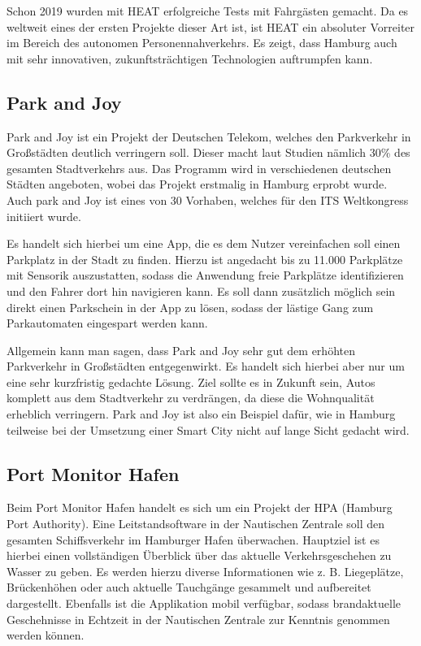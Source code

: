 Schon 2019 wurden mit HEAT erfolgreiche Tests mit Fahrgästen gemacht.
Da es weltweit eines der ersten Projekte dieser Art ist, ist HEAT ein absoluter Vorreiter im Bereich des autonomen Personennahverkehrs.
Es zeigt, dass Hamburg auch mit sehr innovativen, zukunftsträchtigen Technologien auftrumpfen kann.

\subsection{Park and Joy}

Park and Joy ist ein Projekt der Deutschen Telekom, welches den Parkverkehr in Großstädten deutlich verringern soll. Dieser macht laut Studien nämlich 30\% des gesamten Stadtverkehrs aus. Das Programm wird in verschiedenen deutschen Städten angeboten, wobei das Projekt erstmalig in Hamburg erprobt wurde. Auch park and Joy ist eines von 30 Vorhaben, welches für den ITS Weltkongress initiiert wurde. \autocite[vgl.][]{SmartCityKompass.2020a}

Es handelt sich hierbei um eine App, die es dem Nutzer vereinfachen soll einen Parkplatz in der Stadt zu finden. Hierzu ist angedacht bis zu 11.000 Parkplätze mit Sensorik auszustatten, sodass die Anwendung freie Parkplätze identifizieren und den Fahrer dort hin navigieren kann. Es soll dann zusätzlich möglich sein direkt einen Parkschein in der App zu lösen, sodass der lästige Gang zum Parkautomaten eingespart werden kann. \autocite[vgl.][]{ParkandJoy.2020}

Allgemein kann man sagen, dass Park and Joy sehr gut dem erhöhten Parkverkehr in Großstädten entgegenwirkt. Es handelt sich hierbei aber nur um eine sehr kurzfristig gedachte Lösung. Ziel sollte es in Zukunft sein, Autos komplett aus dem Stadtverkehr zu verdrängen, da diese die Wohnqualität erheblich verringern. Park and Joy ist also ein Beispiel dafür, wie in Hamburg teilweise bei der Umsetzung einer Smart City nicht auf lange Sicht gedacht wird.

\subsection{Port Monitor Hafen}

Beim Port Monitor Hafen handelt es sich um ein Projekt der HPA (Hamburg Port Authority).
Eine Leitstandsoftware in der Nautischen Zentrale soll den gesamten Schiffsverkehr im Hamburger Hafen überwachen. Hauptziel ist es hierbei einen vollständigen Überblick über das aktuelle Verkehrsgeschehen zu Wasser zu geben.
Es werden hierzu diverse Informationen wie z. B. Liegeplätze, Brückenhöhen oder auch aktuelle Tauchgänge gesammelt und aufbereitet dargestellt.
Ebenfalls ist die Applikation mobil verfügbar, sodass brandaktuelle Geschehnisse in Echtzeit in der Nautischen Zentrale zur Kenntnis genommen werden können. \autocite[vgl.][]{SmartCityKompass.2020b}

